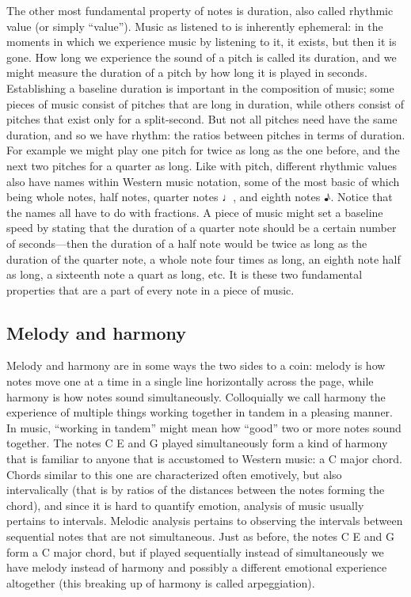 \documentclass{article}
\begin{document}
The other most fundamental property of notes is duration, also called rhythmic
value (or simply “value”). Music as listened to is inherently ephemeral: in the
moments in which we experience music by listening to it, it exists, but then it
is gone. How long we experience the sound of a pitch is called its duration, and
we might measure the duration of a pitch by how long it is played in seconds.
Establishing a baseline duration is important in the composition of music; some
pieces of music consist of pitches that are long in duration, while others
consist of pitches that exist only for a split-second. But not all pitches need
have the same duration, and so we have rhythm: the ratios between pitches in
terms of duration. For example we might play one pitch for twice as long as the
one before, and the next two pitches for a quarter as long. Like with pitch,
different rhythmic values also have names within Western music notation, some of
the most basic of which being whole notes, half notes, quarter notes ♩, and
eighth notes ♪. Notice that the names all have to do with fractions. A piece of
music might set a baseline speed by stating that the duration of a quarter note
should be a certain number of seconds—then the duration of a half note would be
twice as long as the duration of the quarter note, a whole note four times as
long, an eighth note half as long, a sixteenth note a quart as long, etc.
It is these two fundamental properties that are a part of every note in a piece of music.

\subsection{Melody and harmony}

Melody and harmony are in some ways the two sides to a coin: melody is how notes
move one at a time in a single line horizontally across the page, while harmony
is how notes sound simultaneously. Colloquially we call harmony the experience
of multiple things working together in tandem in a pleasing manner. In music,
“working in tandem” might mean how “good” two or more notes sound together. The
notes C E and G played simultaneously form a kind of harmony that is familiar to
anyone that is accustomed to Western music: a C major chord. Chords similar to
this one are characterized often emotively, but also intervalically (that is by
ratios of the distances between the notes forming the chord), and since it is
hard to quantify emotion, analysis of music usually pertains to intervals.
Melodic analysis pertains to observing the intervals between sequential notes
that are not simultaneous. Just as before, the notes C E and G form a C major
chord, but if played sequentially instead of simultaneously we have melody
instead of harmony and possibly a different emotional experience altogether
(this breaking up of harmony is called arpeggiation).
\end{document}

